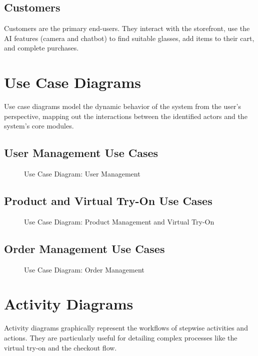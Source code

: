 \subsection{Customers}
Customers are the primary end-users. They interact with the storefront, use the AI features (camera and chatbot) to find suitable glasses, add items to their cart, and complete purchases.

\section{Use Case Diagrams}
\label{sec:req_usecase}
Use case diagrams model the dynamic behavior of the system from the user's perspective, mapping out the interactions between the identified actors and the system's core modules.

\subsection{User Management Use Cases}
\begin{figure}[H]
    \centering
    \vspace{8cm}
    \caption{Use Case Diagram: User Management}
    \label{fig:uc_user_management}
\end{figure}

\subsection{Product and Virtual Try-On Use Cases}
\begin{figure}[H]
    \centering
    \vspace{8cm}
    \caption{Use Case Diagram: Product Management and Virtual Try-On}
    \label{fig:uc_product_management}
\end{figure}

\subsection{Order Management Use Cases}
\begin{figure}[H]
    \centering
    \vspace{8cm}
    \caption{Use Case Diagram: Order Management}
    \label{fig:uc_order_management}
\end{figure}

\section{Activity Diagrams}
\label{sec:req_activity}
Activity diagrams graphically represent the workflows of stepwise activities and actions. They are particularly useful for detailing complex processes like the virtual try-on and the checkout flow.

